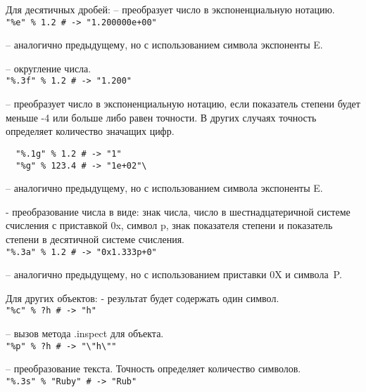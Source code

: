 \begin{keylist}{Для десятичных дробей:}
   – преобразует число в экспоненциальную нотацию.
  \\\verb!"%e" % 1.2 # -> "1.200000e+00"!
  
   – аналогично предыдущему, но с использованием символа экспоненты E.
  
   – округление числа.
  \\\verb!"%.3f" % 1.2 # -> "1.200"!
  
   – преобразует число в экспоненциальную нотацию, если показатель степени будет меньше -4 или больше либо равен точности. В других случаях точность определяет количество значащих цифр.
  \begin{verbatim}
  "%.1g" % 1.2 # -> "1"
  "%g" % 123.4 # -> "1e+02"\
  \end{verbatim}
  
   – аналогично предыдущему, но с использованием символа экспоненты E.

   - преобразование числа в виде: знак числа, число в шестнадцатеричной системе счисления с приставкой 0x, символ p, знак показателя степени и показатель степени в десятичной системе счисления.
  \\\verb!"%.3a" % 1.2 # -> "0x1.333p+0"!
  
   – аналогично предыдущему, но с использованием приставки 0X и символа~P.
\end{keylist}

\begin{keylist}{Для других объектов:}
   - результат будет содержать один символ.
  \\\verb!"%с" % ?h # -> "h"!
  
   – вызов метода .inspect для объекта.
  \\\verb!"%p" % ?h # -> "\"h\""!
  
   – преобразование текста. Точность определяет количество символов.
  \\\verb!"%.3s" % "Ruby" # -> "Rub"!
\end{keylist}

